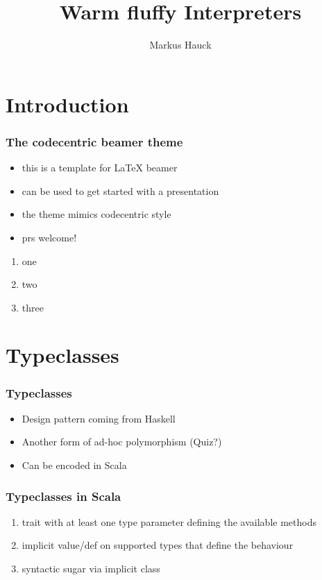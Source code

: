 \documentclass{beamer}
\author{Markus Hauck}
\institute{codecentric AG}
\title{Warm fluffy Interpreters}
\begin{document}
{
  \begin{frame}
    \titlepage{}
  \end{frame}
}

\begin{frame}
  \tableofcontents
\end{frame}


\section{Introduction}

\begin{frame}
  \frametitle{The codecentric beamer theme}
  \begin{itemize}
  \item this is a template for LaTeX beamer
  \item can be used to get started with a presentation
  \item the theme mimics codecentric style
  \item prs welcome!
  \end{itemize}
  \begin{enumerate}
  \item one
  \item two
  \item three
  \end{enumerate}
\end{frame}

\section{Typeclasses}

\begin{frame}
  \frametitle{Typeclasses}
  \begin{itemize}
  \item Design pattern coming from Haskell
  \item Another form of ad-hoc polymorphism (Quiz?)
  \item Can be encoded in Scala
  \end{itemize}
\end{frame}

\begin{frame}
  \frametitle{Typeclasses in Scala}
  \begin{enumerate}
  \item trait with at least one type parameter defining the available
    methods
  \item implicit value/def on supported types that define the
    behaviour
  \item syntactic sugar via implicit class
  \end{enumerate}
\end{frame}
\end{document}

